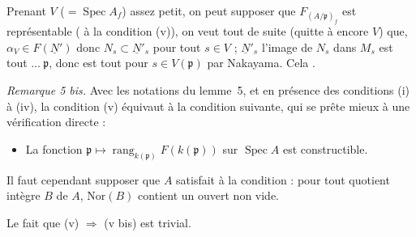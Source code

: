 \documentclass[11pt,a4paper]{article}
\begin{document}
Prenant $V$ ($= \operatorname{Spec} A_f$) assez petit, on peut supposer que
 $F_{(A/\mathfrak{p})_f}$ est représentable
( à la condition (v)), 
 on veut tout de suite \ill{} (quitte à \ill{} encore $V$) que,
$\alpha_V \in F(\underline{N}')$ donc \ill{} $N_s \subset \underline{N}'_s$
pour tout $s \in V$ ;  \ill{} $\underline{N}'_s$ \ill{}
l'image de $N_s$ dans $M_s$  est tout 
$\ldots\ \mathfrak{p}$, donc est tout pour $s \in V(\mathfrak{p})$ par
Nakayama. Cela .

\emph{Remarque 5 bis.} Avec les notations du lemme~5, et en présence des
conditions (i) à (iv), la condition (v) équivaut à la condition suivante, qui
se prête mieux à une vérification directe :
\begin{itemize}
  \item[(v bis)] La fonction $\mathfrak{p} \mapsto
    \operatorname{rang}_{k(\mathfrak{p})} F(k(\mathfrak{p}))$ sur
    $\operatorname{Spec} A$ est constructible.
\end{itemize}
Il faut cependant supposer que $A$ satisfait à la condition : pour tout
quotient intègre $B$ de $A$, $\mathrm{Nor}(B)$ contient un ouvert non vide.

Le fait que (v) $\Rightarrow$ (v bis) est trivial.
\end{document}
